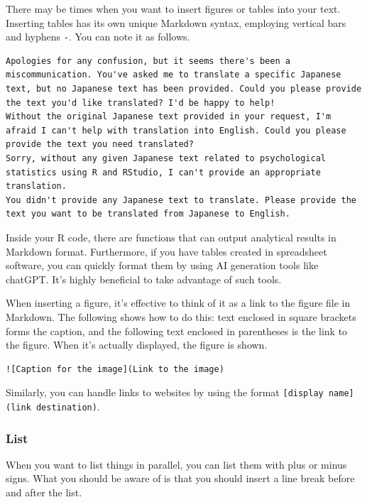 \documentclass[
  a4paper,
]{book}
\begin{document}
There may be times when you want to insert figures or tables into your
text. Inserting tables has its own unique Markdown syntax, employing
vertical bars \texttt{\textbar{}} and hyphens \texttt{-}. You can note
it as follows.

\begin{verbatim}
Apologies for any confusion, but it seems there's been a miscommunication. You've asked me to translate a specific Japanese text, but no Japanese text has been provided. Could you please provide the text you'd like translated? I'd be happy to help!
Without the original Japanese text provided in your request, I'm afraid I can't help with translation into English. Could you please provide the text you need translated?
Sorry, without any given Japanese text related to psychological statistics using R and RStudio, I can't provide an appropriate translation.
You didn't provide any Japanese text to translate. Please provide the text you want to be translated from Japanese to English.
\end{verbatim}

Inside your R code, there are functions that can output analytical
results in Markdown format. Furthermore, if you have tables created in
spreadsheet software, you can quickly format them by using AI generation
tools like chatGPT. It's highly beneficial to take advantage of such
tools.

When inserting a figure, it's effective to think of it as a link to the
figure file in Markdown. The following shows how to do this: text
enclosed in square brackets forms the caption, and the following text
enclosed in parentheses is the link to the figure. When it's actually
displayed, the figure is shown.

\begin{verbatim}
![Caption for the image](Link to the image)
\end{verbatim}

Similarly, you can handle links to websites by using the format
\texttt{{[}display\ name{]}(link\ destination)}.

\subsubsection{List}\label{list}

When you want to list things in parallel, you can list them with plus or
minus signs. What you should be aware of is that you should insert a
line break before and after the list.
\end{document}
